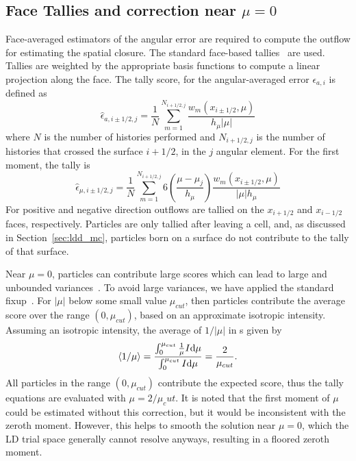 \subsection{Face Tallies and correction near $\mu=0$}
\label{sec:face_tallies}

Face-averaged estimators of the angular error are required to compute the outflow for
estimating the spatial closure. The standard face-based
tallies~\cite{shultis_mc,favorite_faces} are used.  Tallies are weighted by
the appropriate basis functions to compute a linear projection along the face.  The
tally score, for the angular-averaged error $\epsilon_{a,i}$ is defined as
\begin{equation}
    \hat \epsilon_{a,i\pm1/2,j} = \frac{1}{N} \sum_{m=1}^{N_{i+1/2,j}}
    \frac{w_m(x_{i\pm1/2},\mu)}{h_{\mu} |\mu|}
\end{equation}
where $N$ is the number of histories performed and $N_{i+1/2,j}$ is the number of histories
that crossed the surface $i+1/2$, in the $j$ angular element.   For the first
moment, the tally is
\begin{equation}
    \hat \epsilon_{\mu,i\pm1/2,j} = \frac{1}{N} \sum_{m=1}^{N_{i+1/2,j}} 
    6\left(\frac{\mu-\mu_j}{h_\mu}\right) \frac{w_m(x_{i\pm1/2},\mu)}{|\mu| h_{\mu}}
\end{equation}
For positive and negative direction outflows are tallied
on the $x_{i+1/2}$ and $x_{i-1/2}$ faces, respectively. Particles are only tallied after leaving
a cell, and, as discussed in Section~\ref{sec:ldd_mc}, particles born on a surface do not contribute
to the tally of that surface.

Near $\mu=0$, particles can contribute large scores which can lead to large and
unbounded variances~\cite{favorite_faces}.  To avoid large variances, we have applied the standard fixup~\cite{mcnp,favorite_faces}.  
For $|\mu|$ below some small value $\mu_{cut}$, then 
particles contribute the average score over the range $(0,\mu_{cut})$, based on an
approximate isotropic intensity.  Assuming an isotropic intensity, the average of
$1/|\mu|$ in s given by
\begin{equation}
    \langle 1/\mu \rangle = \frac{\int_0^{\mu_{cut}}\frac{1}{\mu} I \mathrm{d} \mu}{\int_0^{\mu_{cut}} I \mathrm{d} \mu} =
    \frac{2}{\mu_{cut}}.
\end{equation}
All particles in the range $(0,\mu_{cut})$ contribute the expected score, thus the tally
equations are evaluated with $\mu = 2/\mu_cut$.  It is noted that the first moment of $\mu$
could be estimated without this correction, but it would be inconsistent with the zeroth
moment.  However, this helps to smooth the solution near $\mu=0$, which the LD trial space
generally cannot resolve anyways, resulting in a floored zeroth moment.
